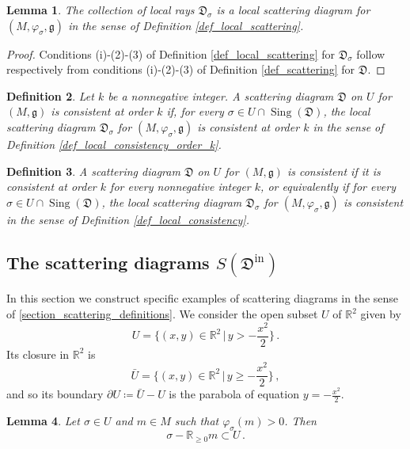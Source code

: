 \documentclass[12pt, a4paper]{amsart}
\newtheorem{defn}{Definition}[section]
\newtheorem{lem}[defn]{Lemma}
\newcommand\R{\mathbb R}
\newcommand\fD{\mathfrak D}
\newcommand\fg{\mathfrak g}
\newcommand\Sing{\operatorname{Sing}}
\newcommand\iin{\mathrm{in}}
\begin{document}
\begin{lem} \label{lem_local_scattering}
The collection of local rays $\fD_\sigma$ is a local scattering diagram for
$(M, \varphi_\sigma,\fg)$
in the sense of Definition \ref{def_local_scattering}.
\end{lem}

\begin{proof}
Conditions (i)-(2)-(3) of Definition \ref{def_local_scattering} for $\fD_\sigma$ follow respectively from conditions (i)-(2)-(3) of Definition 
\ref{def_scattering} for $\fD$.
\end{proof}


\begin{defn} \label{def_consistency_order_k}
Let $k$ be a nonnegative integer.
A scattering diagram $\fD$ on $U$
for $(M,\fg)$
is 
\emph{consistent at order $k$} if, for every $\sigma \in U \cap \Sing(\fD)$, the local scattering 
diagram $\fD_\sigma$ for 
$(M,\varphi_\sigma,\fg)$ is consistent at order $k$ in the sense of Definition \ref{def_local_consistency_order_k}.
\end{defn}

\begin{defn} \label{def_consistency}
A scattering diagram $\fD$
on $U$
for $(M,\fg)$
is 
\emph{consistent} if it is consistent at order $k$ for every nonnegative integer $k$, or equivalently if for every $\sigma \in U \cap \Sing(\fD)$, the local scattering 
diagram $\fD_\sigma$ for 
$(M,\varphi_\sigma,\fg)$ is consistent in the sense of Definition \ref{def_local_consistency}.
\end{defn}


\subsection{The scattering diagrams $S(\fD^\iin)$}\label{section_initial}
In this section we construct specific examples of scattering diagrams in the sense of  \cref{section_scattering_definitions}.
We consider the open subset $U$ of $\R^2$ given by 
\[ U=\{(x,y) \in \R^2 \,|\, y >-\frac{x^2}{2}\}\,.\]
Its closure in $\R^2$ is 
\[ \bar{U}=\{(x,y) \in \R^2 \,|\, y \geqslant -\frac{x^2}{2}\}\,,\]
and so its boundary $\partial U \coloneq \bar{U}-U$ is the parabola of equation $y=-\frac{x^2}{2}$.

\begin{lem}\label{lem_stay_in_U}
Let $\sigma \in U$ and 
$m \in M$ such that 
$\varphi_\sigma(m)>0$. Then
\[\sigma - \R_{\geqslant 0} m \subset U \,.\]
\end{lem}
\end{document}
